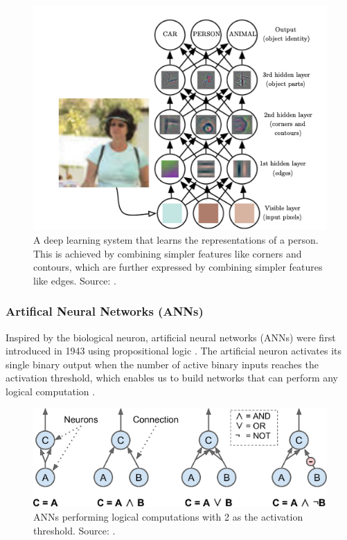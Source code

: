 \documentclass[a4paper, 11pt, oneside]{article}
\begin{document}
  \begin{figure}[ht]
    \begin{center}
      \includegraphics[width=.8\textwidth]{deep_learning.png}
    \end{center}
    \caption{A deep learning system that learns the representations of a person. This is achieved by combining simpler
    features like corners and contours, which are further expressed by combining simpler features like edges. Source:
    \cite{goodfellow2016deep}.}
  \end{figure}

  \subsubsection{Artifical Neural Networks (ANNs)}

  Inspired by the biological neuron, artificial neural networks (ANNs) were first introduced in 1943 using propositional
  logic \cite{mcculloch1943logical}. The artificial neuron activates its single binary output when the number of active
  binary inputs reaches the activation threshold, which enables us to build networks that can perform any logical
  computation \cite{geron2019hands, mcculloch1943logical}.

  \begin{figure}[ht]
    \begin{center}
      \includegraphics[width=.8\textwidth]{ann_logic_computations.png}
    \end{center}
    \caption{ANNs performing logical computations with 2 as the activation threshold. Source: \cite{geron2019hands}.}
  \end{figure}
\end{document}
